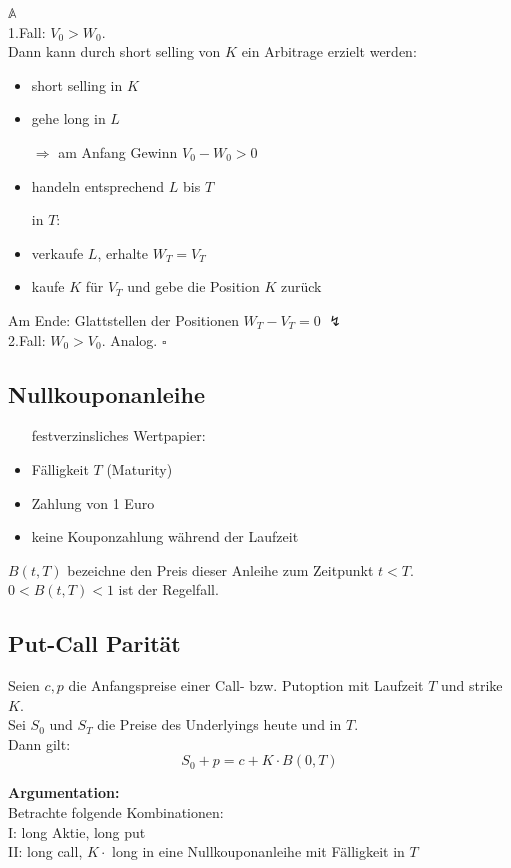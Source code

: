 \documentclass[a4paper, pagesize=pdftex, pdftex, twoside, headsepline, index=totoc,toc=listof, fontsize=10pt, cleardoublepage=empty, headinclude, DIV=13, BCOR=13mm]{scrartcl}
\begin{document}
\underline{$\mathds{A}$} \\
1.Fall: $V_0>W_0$. \\
Dann kann durch short selling von $K$ ein Arbitrage erzielt werden:
\begin{itemize}
	\item short selling in $K$
	\item gehe long in $L$
	\item[$\Rightarrow$ am Anfang Gewinn $V_0-W_0>0$]
	\item handeln entsprechend $L$ bis $T$
	\item[in $T$:]
	\item verkaufe $L$, erhalte $W_T = V_T$ 
	\item kaufe $K$ für $V_T$ und gebe die Position $K$ zurück
\end{itemize}
Am Ende: Glattstellen der Positionen $W_T - V_T = 0$ \textbf{$\lightning$} \\

2.Fall: $W_0>V_0$. Analog.
\hfill $\square$


\subsection{Nullkouponanleihe}
\label{sub: nullkouponanleihe}
\begin{itemize}
	\item[festverzinsliches Wertpapier:]
	\item Fälligkeit $T$ (Maturity)
	\item Zahlung von 1 Euro
	\item keine Kouponzahlung während der Laufzeit
\end{itemize}
$B(t,T)$ bezeichne den Preis dieser Anleihe zum Zeitpunkt $t<T$. $0<B(t,T)<1$ ist der Regelfall.


\subsection{Put-Call Parität}
\label{sub: put-call_parität}
Seien $c,p$ die Anfangspreise einer Call- bzw. Putoption mit Laufzeit $T$ und strike $K$.\\
Sei $S_0$ und $S_T$ die Preise des Underlyings heute und in $T$. \\
Dann gilt: 
\[
	S_0 + p = c + K\cdot B(0,T)
\]

\textbf{Argumentation:} \\
Betrachte folgende Kombinationen:\\
I: long Aktie, long put\\
II: long call, $K \cdot $ long in eine Nullkouponanleihe mit Fälligkeit in $T$\\
\end{document}
